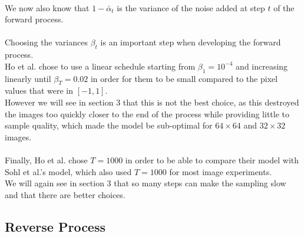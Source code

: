 \documentclass{article}
\begin{document}
\\
We now also know that $1 - \bar{\alpha}_t$ is the variance of the noise added at step $t$ of the forward process. \cite{nichol2021improved}
\\\\
Choosing the variances $\beta_t$ is an important step when developing the forward process. \\
Ho et al. \cite{ho2020denoising} chose to use a linear schedule starting from $\beta_1 = 10^{-4}$ and increasing linearly until $\beta_T = 0.02$ in order for them to be small compared to the pixel values that were in $\left[-1, 1\right]$. \cite{ho2020denoising} \\
However we will see in section 3 that this is not the best choice, as this destroyed the images too quickly closer to the end of the process while providing little to sample quality, which made the model be sub-optimal for $64 \times 64$ and $32 \times 32$ images. \cite{nichol2021improved}
\\\\
Finally, Ho et al. \cite{ho2020denoising} chose $T = 1000$ in order to be able to compare their model with Sohl et al.'s \cite{sohldickstein2015deep} model, which also used $T = 1000$ for most image experiments. \\
We will again see in section 3 that so many steps can make the sampling slow and that there are better choices. \cite{nichol2021improved}
\subsection{Reverse Process}
\end{document}
